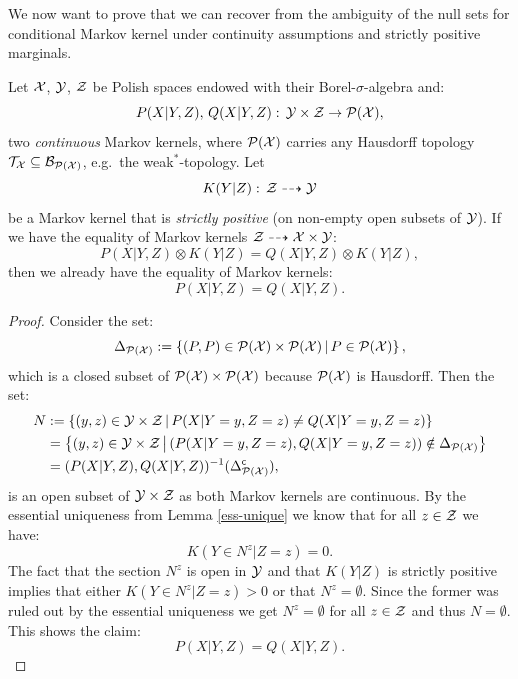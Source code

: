 We now want to prove that we can recover from the ambiguity of the null sets for conditional Markov kernel under continuity assumptions and strictly positive marginals.

\begin{Lem}
    \label{lem:cont-cond-unique}
    Let $\mathcal{X}$, $\mathcal{Y}$, $\mathcal{Z}$ be Polish spaces endowed with their Borel-$\sigma$-algebra and:
    \[P(X|Y,Z),\,Q(X|Y,Z):\, \mathcal{Y}\times \mathcal{Z} \to \mathcal{P}(\mathcal{X}),\]
    two \emph{continuous} Markov kernels, where $\mathcal{P}(\mathcal{X})$ carries any Hausdorff topology $\mathcal{T}_{\mathcal{X}} \subseteq \mathcal{B}_{\mathcal{P}(\mathcal{X})}$, e.g.\ the weak$^*$-topology.
    Let  \[K(Y|Z):\,\mathcal{Z} \dashrightarrow \mathcal{Y}\]
    be a Markov kernel that is \emph{strictly positive} (on non-empty open subsets of $\mathcal{Y}$).
    If we have the equality of Markov kernels $\mathcal{Z} \dashrightarrow \mathcal{X} \times \mathcal{Y}$:
    \[ P(X|Y,Z) \otimes K(Y|Z) = Q(X|Y,Z) \otimes K(Y|Z), \]
    then we already have the equality of Markov kernels:
    \[ P(X|Y,Z)  = Q(X|Y,Z). \]
    \begin{proof}
      Consider the set:
      \[ \Delta_{\mathcal{P}(\mathcal{X})} := \left \{ (P,P) \in \mathcal{P}(\mathcal{X}) \times \mathcal{P}(\mathcal{X}) \,\middle|\, P \in \mathcal{P}(\mathcal{X}) \right \}, \]
      which is a closed subset of $\mathcal{P}(\mathcal{X})\times \mathcal{P}(\mathcal{X})$ because $\mathcal{P}(\mathcal{X})$ is Hausdorff.
     Then the set:
        \begin{align*}
          N &:= \left \{ (y,z) \in \mathcal{Y} \times \mathcal{Z} \,\middle|\, P(X|Y=y,Z=z)  \neq Q(X|Y=y,Z=z) \right \} \\
            &= \left \{ (y,z) \in \mathcal{Y} \times \mathcal{Z} \,\middle|\, (P(X|Y=y,Z=z),Q(X|Y=y,Z=z)) \notin \Delta_{\mathcal{P}(\mathcal{X})} \right \} \\
            &=(P(X|Y,Z), Q(X|Y,Z))^{-1}(\Delta_{\mathcal{P}(\mathcal{X})}^{\mathsf{c}}), 
        \end{align*}
        is an open subset of $\mathcal{Y} \times \mathcal{Z}$ as both Markov kernels are continuous.
        By the essential uniqueness from Lemma \ref{ess-unique} we know that for all $z \in \mathcal{Z}$ we have:
        \[ K(Y \in N^z|Z=z) =0.  \]
        The fact that the section $N^z$ is open in $\mathcal{Y}$ and that $K(Y|Z)$ is strictly positive 
        implies that either $K(Y \in N^z|Z=z) >0$ or that $N^z=\emptyset$.
        Since the former was ruled out by the essential uniqueness we get $N^z=\emptyset$ for all $z \in \mathcal{Z}$ and thus $N=\emptyset$.
        This shows the claim:
    \[ P(X|Y,Z)  = Q(X|Y,Z). \]
    \end{proof}
\end{Lem}


